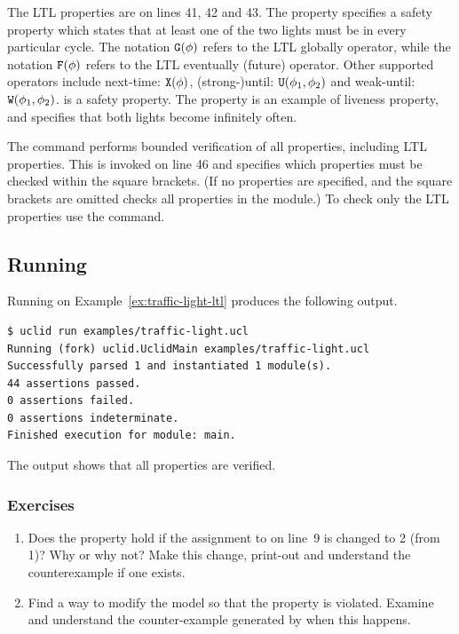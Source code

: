 The LTL properties are on lines 41, 42 and 43. The property  specifies a safety property which states that at least one of the two lights must be  in every particular cycle. The notation $\texttt{G}(\phi)$ refers to the LTL globally operator, while the notation $\texttt{F}(\phi)$ refers to the LTL eventually (future) operator. Other supported operators include next-time: $\texttt{X}(\phi)$, (strong-)until: $\texttt{U}(\phi_1, \phi_2)$ and weak-until: $\texttt{W}(\phi_1, \phi_2)$.  is a safety property. The property  is an example of liveness property, and specifies that both lights become  infinitely often.

The command  performs bounded verification of all properties, including LTL properties. This is invoked on line 46 and specifies which properties must be checked within the square brackets. (If no properties are specified, and the square brackets are omitted  checks all properties in the module.) To check only the LTL properties use the  command. 

\subsection{Running \uclid{}}
Running \uclid{} on Example~\ref{ex:traffic-light-ltl} produces the following output.
\begin{Verbatim}[frame=single, samepage=true]
$ uclid run examples/traffic-light.ucl
Running (fork) uclid.UclidMain examples/traffic-light.ucl
Successfully parsed 1 and instantiated 1 module(s).
44 assertions passed.
0 assertions failed.
0 assertions indeterminate.
Finished execution for module: main.
\end{Verbatim}

The output shows that all properties are verified.

\subsubsection{Exercises}
\begin{enumerate}
    \item Does the property  hold if the assignment to  on line~9 is changed to 2 (from 1)? Why or why not? Make this change, print-out and understand the counterexample if one exists.

    \item Find a way to modify the model so that the property  is violated. Examine and understand the counter-example generated by \uclid{} when this happens.
\end{enumerate}

